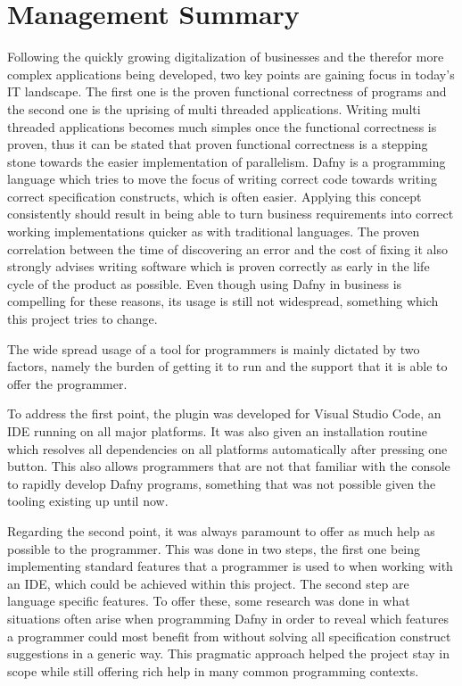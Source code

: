 \section{Management Summary}
Following the quickly growing digitalization of businesses and the therefor more complex applications being developed, two key points are gaining focus in today's IT landscape. The first one is the proven functional correctness of programs and the second one is the uprising of multi threaded applications. Writing multi threaded applications becomes much simples once the functional correctness is proven, thus it can be stated that proven functional correctness is a stepping stone towards the easier implementation of parallelism. Dafny is a programming language which tries to move the focus of writing correct code towards writing correct specification constructs, which is often easier. Applying this concept consistently should result in being able to turn business requirements into correct working implementations quicker as with traditional languages. The proven correlation between the time of discovering an error and the cost of fixing it also strongly advises writing software which is proven correctly as early in the life cycle of the product as possible. Even though using Dafny in business is compelling for these reasons, its usage is still not widespread, something which this project tries to change.\newline

The wide spread usage of a tool for programmers is mainly dictated by two factors, namely the burden of getting it to run and the support that it is able to offer the programmer. \newline

To address the first point, the plugin was developed for Visual Studio Code, an IDE running on all major platforms. It was also given an installation routine which resolves all dependencies on all platforms automatically after pressing one button. This also allows programmers that are not that familiar with the console to rapidly develop Dafny programs, something that was not possible given the tooling existing up until now. \newline

Regarding the second point, it was always paramount to offer as much help as possible to the programmer. This was done in two steps, the first one being implementing standard features that a programmer is used to when working with an IDE, which could be achieved within this project. The second step are language specific features. To offer these, some research was done in what situations often arise when programming Dafny in order to reveal which features a programmer could most benefit from without solving all specification construct suggestions in a generic way. This pragmatic approach helped the project stay in scope while still offering rich help in many common programming contexts. \newline

